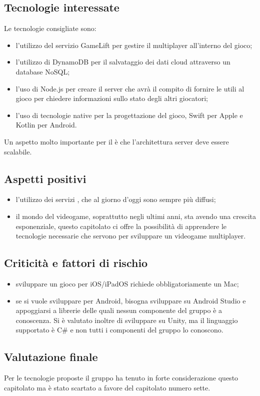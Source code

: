\subsection{Tecnologie interessate}
Le tecnologie consigliate sono:
\begin{itemize}
\item l'utilizzo del servizio  GameLift per gestire il multiplayer all'interno del gioco;
\item l'utilizzo di  DynamoDB per il salvataggio dei dati cloud attraverso un database NoSQL;
\item l'uso di Node.js per creare il server che avrà il compito di fornire le  utili al gioco per chiedere informazioni sullo stato degli altri giocatori;
\item l'uso di tecnologie native per la progettazione del gioco, Swift per Apple e Kotlin per Android.
\end{itemize}
Un aspetto molto importante per il  è che l'architettura server deve essere scalabile.

\subsection{Aspetti positivi}
\begin{itemize}
\item l'utilizzo dei servizi  , che al giorno d'oggi sono sempre più diffusi;
\item il mondo del videogame, soprattutto negli ultimi anni, sta avendo una crescita esponenziale, questo capitolato ci offre la possibilità di apprendere le tecnologie necessarie che servono per sviluppare un videogame multiplayer.
\end{itemize}

\subsection{Criticità e fattori di rischio}
\begin{itemize}
\item sviluppare un gioco per iOS/iPadOS richiede obbligatoriamente un Mac;
\item se si vuole sviluppare per Android, bisogna sviluppare su Android Studio e appoggiarsi a librerie delle quali nessun componente del gruppo è a conoscenza. Si è valutato inoltre di sviluppare su Unity, ma il linguaggio supportato è C\# e non tutti i componenti del gruppo lo conoscono.
\end{itemize}

\subsection{Valutazione finale}
Per le tecnologie proposte il gruppo \textit{\Gruppo{}} ha tenuto in forte considerazione questo capitolato ma è stato scartato a favore del capitolato numero sette.